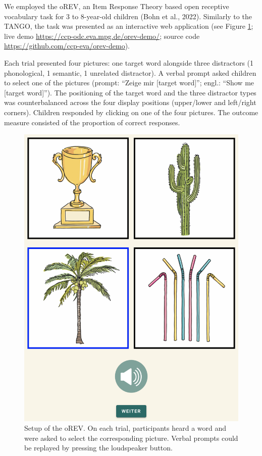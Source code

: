 \documentclass[
  man,floatsintext]{apa6}
\begin{document}
We employed the oREV, an Item Response Theory based open receptive vocabulary task for 3 to 8-year-old children (Bohn et al., 2022). Similarly to the TANGO, the task was presented as an interactive web application (see Figure \ref{fig:fig5}; live demo \url{https://ccp-odc.eva.mpg.de/orev-demo/}; source code \url{https://github.com/ccp-eva/orev-demo}).

Each trial presented four pictures: one target word alongside three distractors (1 phonological, 1 semantic, 1 unrelated distractor). A verbal prompt asked children to select one of the pictures (prompt: ``Zeige mir {[}target word{]}''; engl.: ``Show me {[}target word{]}''). The positioning of the target word and the three distractor types was counterbalanced across the four display positions (upper/lower and left/right corners). Children responded by clicking on one of the four pictures. The outcome measure consisted of the proportion of correct responses.



\begin{figure}

{\centering \includegraphics[width=1\linewidth]{../figures/orev_procedure} 

}

\caption{Setup of the oREV. On each trial, participants heard a word and were asked to select the corresponding picture. Verbal prompts could be replayed by pressing the loudspeaker button.}\label{fig:fig5}
\end{figure}
\end{document}
